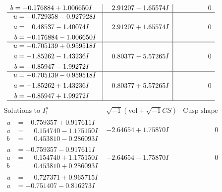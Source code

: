 \documentclass[1p]{elsarticle_modified}
\theoremstyle{definition}
\newcommand{\I}{\sqrt{-1}}
\begin{document}
$$\begin{array}{c|c|c}
\begin{aligned}
b &= -0.176884 + 1.006650 I\end{aligned}
 & \phantom{-}2.91207 - 1.65574 I & \phantom{-0.000000 } 0 \\ \hline\begin{aligned}
u &= -0.729358 - 0.927928 I \\
a &= \phantom{-}0.48537 - 1.40074 I \\
b &= -0.176884 - 1.006650 I\end{aligned}
 & \phantom{-}2.91207 + 1.65574 I & \phantom{-0.000000 } 0 \\ \hline\begin{aligned}
u &= -0.705139 + 0.959518 I \\
a &= -1.85262 - 1.43236 I \\
b &= -0.85947 - 1.99272 I\end{aligned}
 & \phantom{-}0.80377 - 5.57265 I & \phantom{-0.000000 } 0 \\ \hline\begin{aligned}
u &= -0.705139 - 0.959518 I \\
a &= -1.85262 + 1.43236 I \\
b &= -0.85947 + 1.99272 I\end{aligned}
 & \phantom{-}0.80377 + 5.57265 I & \phantom{-0.000000 } 0\\
 \hline 
 \end{array}$$\newpage$$\begin{array}{c|c|c}  
\text{Solutions to }I^u_{1}& \I (\text{vol} + \sqrt{-1}CS) & \text{Cusp shape}\\
 \hline 
\begin{aligned}
u &= -0.759357 + 0.917611 I \\
a &= \phantom{-}0.154740 - 1.175150 I \\
b &= \phantom{-}0.453810 - 0.286093 I\end{aligned}
 & -2.64654 + 1.75870 I & \phantom{-0.000000 } 0 \\ \hline\begin{aligned}
u &= -0.759357 - 0.917611 I \\
a &= \phantom{-}0.154740 + 1.175150 I \\
b &= \phantom{-}0.453810 + 0.286093 I\end{aligned}
 & -2.64654 - 1.75870 I & \phantom{-0.000000 } 0 \\ \hline\begin{aligned}
u &= \phantom{-}0.727371 + 0.965715 I \\
a &= -0.751407 - 0.816273 I \\

\end{aligned}
\end{array}$$
\end{document}
